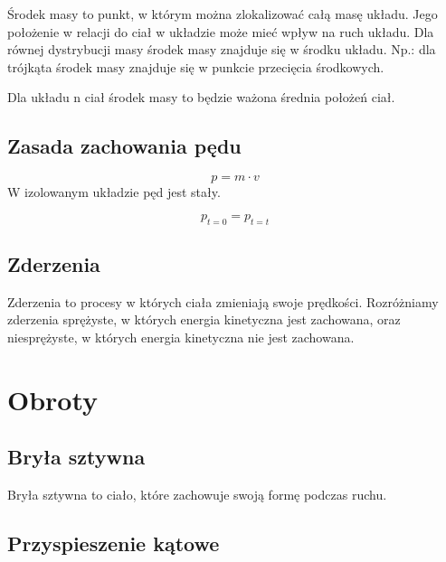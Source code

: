 \documentclass{../notatki}
\begin{document}
Środek masy to punkt, w którym można zlokalizować całą masę układu. Jego
położenie w relacji do ciał w układzie może mieć wpływ na ruch układu.
Dla równej dystrybucji masy środek masy znajduje się w środku układu.
Np.: dla trójkąta środek masy znajduje się w punkcie przecięcia środkowych.

\begin{figure*}[h]
  \centering
\end{figure*}

Dla układu n ciał środek masy to będzie ważona średnia położeń ciał.

\subsection{Zasada zachowania pędu}

$$
p = m \cdot v
$$
W izolowanym układzie pęd jest stały.

$$
p_{t=0} = p_{t=t}
$$

\subsection{Zderzenia}

Zderzenia to procesy w których ciała zmieniają swoje prędkości. Rozróżniamy
zderzenia sprężyste, w których energia kinetyczna jest zachowana, oraz
niesprężyste, w których energia kinetyczna nie jest zachowana.

\section{Obroty}

\subsection{Bryła sztywna}

Bryła sztywna to ciało, które zachowuje swoją formę podczas ruchu.

\subsection{Przyspieszenie kątowe}
\end{document}
